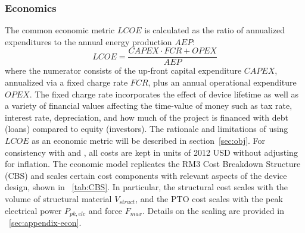 \subsubsection{Economics}\label{sec:econ}
The common economic metric $LCOE$ is calculated as the ratio of annualized expenditures to the annual energy production $AEP$:
\begin{equation}
	LCOE = \frac{CAPEX\cdot  FCR + OPEX}{AEP}
\end{equation}
where the numerator consists of the up-front capital expenditure $CAPEX$, annualized via a fixed charge rate $FCR$, plus an annual operational expenditure $OPEX$.
The fixed charge rate incorporates the effect of device lifetime as well as a variety of financial values affecting the time-value of money such as tax rate, interest rate, depreciation, and how much of the project is financed with debt (loans) compared to equity (investors).
The rationale and limitations of using $LCOE$ as an economic metric will be described in section~\ref{sec:obj}.
For consistency with \cite{neary_reference_2014} and \cite{RM3}, all costs are kept in units of 2012 USD without adjusting for inflation.
The economic model replicates the RM3 Cost Breakdown Structure (CBS) \cite{neary_reference_2014} and scales certain cost components with relevant aspects of the device design, shown in \tablename~\ref{tab:CBS}.
In particular, the structural cost scales with the volume of structural material $V_{struct}$, and the PTO cost scales with the peak electrical power $P_{pk,elc}$ and force $F_{max}$. %
Details on the scaling are provided in \appendixname~\ref{sec:appendix-econ}.
